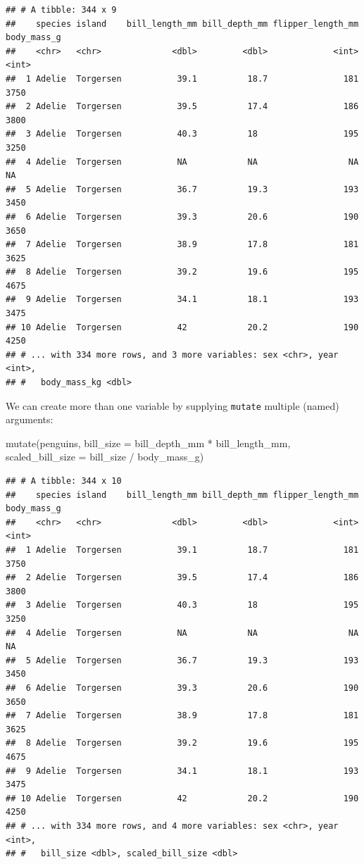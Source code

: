 \documentclass[
]{book}
\newenvironment{Shaded}{\begin{snugshade}}{\end{snugshade}}
\newcommand{\AttributeTok}[1]{\textcolor[rgb]{0.77,0.63,0.00}{#1}}
\newcommand{\FunctionTok}[1]{\textcolor[rgb]{0.00,0.00,0.00}{#1}}
\newcommand{\NormalTok}[1]{#1}
\newcommand{\SpecialCharTok}[1]{\textcolor[rgb]{0.00,0.00,0.00}{#1}}
\begin{document}
\begin{verbatim}
## # A tibble: 344 x 9
##    species island    bill_length_mm bill_depth_mm flipper_length_mm body_mass_g
##    <chr>   <chr>              <dbl>         <dbl>             <int>       <int>
##  1 Adelie  Torgersen           39.1          18.7               181        3750
##  2 Adelie  Torgersen           39.5          17.4               186        3800
##  3 Adelie  Torgersen           40.3          18                 195        3250
##  4 Adelie  Torgersen           NA            NA                  NA          NA
##  5 Adelie  Torgersen           36.7          19.3               193        3450
##  6 Adelie  Torgersen           39.3          20.6               190        3650
##  7 Adelie  Torgersen           38.9          17.8               181        3625
##  8 Adelie  Torgersen           39.2          19.6               195        4675
##  9 Adelie  Torgersen           34.1          18.1               193        3475
## 10 Adelie  Torgersen           42            20.2               190        4250
## # ... with 334 more rows, and 3 more variables: sex <chr>, year <int>,
## #   body_mass_kg <dbl>
\end{verbatim}

We can create more than one variable by supplying \texttt{mutate} multiple (named) arguments:

\begin{Shaded}
\begin{Highlighting}[]
\FunctionTok{mutate}\NormalTok{(penguins, }
       \AttributeTok{bill\_size =}\NormalTok{ bill\_depth\_mm }\SpecialCharTok{*}\NormalTok{ bill\_length\_mm,}
       \AttributeTok{scaled\_bill\_size =}\NormalTok{ bill\_size }\SpecialCharTok{/}\NormalTok{ body\_mass\_g)}
\end{Highlighting}
\end{Shaded}

\begin{verbatim}
## # A tibble: 344 x 10
##    species island    bill_length_mm bill_depth_mm flipper_length_mm body_mass_g
##    <chr>   <chr>              <dbl>         <dbl>             <int>       <int>
##  1 Adelie  Torgersen           39.1          18.7               181        3750
##  2 Adelie  Torgersen           39.5          17.4               186        3800
##  3 Adelie  Torgersen           40.3          18                 195        3250
##  4 Adelie  Torgersen           NA            NA                  NA          NA
##  5 Adelie  Torgersen           36.7          19.3               193        3450
##  6 Adelie  Torgersen           39.3          20.6               190        3650
##  7 Adelie  Torgersen           38.9          17.8               181        3625
##  8 Adelie  Torgersen           39.2          19.6               195        4675
##  9 Adelie  Torgersen           34.1          18.1               193        3475
## 10 Adelie  Torgersen           42            20.2               190        4250
## # ... with 334 more rows, and 4 more variables: sex <chr>, year <int>,
## #   bill_size <dbl>, scaled_bill_size <dbl>
\end{verbatim}
\end{document}
